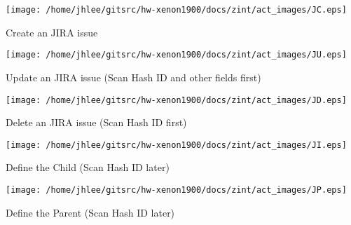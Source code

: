 \noindent
\vspace{1.4cm}
\begin{minipage}{.2\textwidth}
\begin{center}
\texttt{[image: /home/jhlee/gitsrc/hw-xenon1900/docs/zint/act\_images/JC.eps]}
\end{center}
\end{minipage}
\begin{minipage}{.7\textwidth}
Create an JIRA issue 
\end{minipage}


\noindent
\vspace{1.4cm}
\begin{minipage}{.2\textwidth}
\begin{center}
\texttt{[image: /home/jhlee/gitsrc/hw-xenon1900/docs/zint/act\_images/JU.eps]}
\end{center}
\end{minipage}
\begin{minipage}{.7\textwidth}
Update an JIRA issue (Scan Hash ID and other fields first)
\end{minipage}


\noindent
\vspace{1.4cm}
\begin{minipage}{.2\textwidth}
\begin{center}
\texttt{[image: /home/jhlee/gitsrc/hw-xenon1900/docs/zint/act\_images/JD.eps]}
\end{center}
\end{minipage}
\begin{minipage}{.7\textwidth}
Delete an JIRA issue (Scan Hash ID first)
\end{minipage}


\noindent
\vspace{1.4cm}
\begin{minipage}{.2\textwidth}
\begin{center}
\texttt{[image: /home/jhlee/gitsrc/hw-xenon1900/docs/zint/act\_images/JI.eps]}
\end{center}
\end{minipage}
\begin{minipage}{.7\textwidth}
Define the Child (Scan Hash ID later)
\end{minipage}


\noindent
\vspace{1.4cm}
\begin{minipage}{.2\textwidth}
\begin{center}
\texttt{[image: /home/jhlee/gitsrc/hw-xenon1900/docs/zint/act\_images/JP.eps]}
\end{center}
\end{minipage}
\begin{minipage}{.7\textwidth}
Define the Parent (Scan Hash ID later)
\end{minipage}


